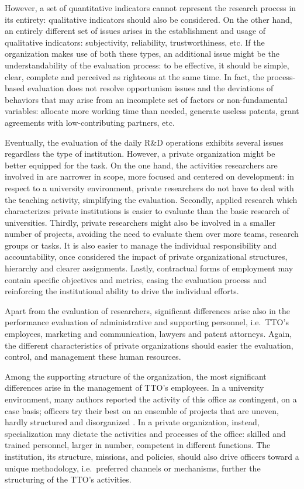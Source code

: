 However, a set of quantitative indicators cannot represent the research process in its entirety: qualitative indicators should also be considered. On the other hand, an entirely different set of issues arises in the establishment and usage of qualitative indicators: subjectivity, reliability, trustworthiness, etc. If the organization makes use of both these types, an additional issue might be the understandability of the evaluation process: to be effective, it should be simple, clear, complete and perceived as righteous at the same time. In fact, the process-based evaluation does not resolve opportunism issues and the deviations of behaviors that may arise from an incomplete set of factors or non-fundamental variables: allocate more working time than needed, generate useless patents, grant agreements with low-contributing partners, etc. 

Eventually, the evaluation of the daily R\&D operations exhibits several issues regardless the type of institution. However, a private organization might be better equipped for the task. On the one hand, the activities researchers are involved in are narrower in scope, more focused and centered on development: in respect to a university environment, private researchers do not have to deal with the teaching activity, simplifying the evaluation. Secondly, applied research which characterizes private institutions is easier to evaluate than the basic research of universities. Thirdly, private researchers might also be involved in a smaller number of projects, avoiding the need to evaluate them over more teams, research groups or tasks. It is also easier to manage the individual responsibility and accountability, once considered the impact of private organizational structures, hierarchy and clearer assignments. Lastly, contractual forms of employment may contain specific objectives and metrics, easing the evaluation process and reinforcing the institutional ability to drive the individual efforts. 

Apart from the evaluation of researchers, significant differences arise also in the performance evaluation of administrative and supporting personnel, i.e.\ TTO's employees, marketing and communication, lawyers and patent attorneys. Again, the different characteristics of private organizations should easier the evaluation, control, and management these human resources.

Among the supporting structure of the organization, the most significant differences arise in the management of TTO's employees. In a university environment, many authors reported the activity of this office as contingent, on a case basis; officers try their best on an ensemble of projects that are uneven, hardly structured and disorganized \citep{Jensen2003}. In a private organization, instead, specialization may dictate the activities and processes of the office: skilled and trained personnel, larger in number, competent in different functions. The institution, its structure, missions, and policies, should also drive officers toward a unique methodology, i.e.\ preferred channels or mechanisms, further the structuring of the TTO's activities. 

